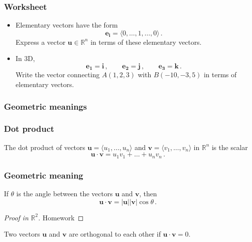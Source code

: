 \documentclass[aspectratio=169]{beamer}
\newcommand{\vect}{\mathbf}
\begin{document}
\begin{frame}
    \frametitle{Worksheet}
    \begin{itemize}
        \item Elementary vectors have the form
    $$ \vect{e_i} = \langle 0, \dots, 1,  \dots, 0\rangle \,.$$
    Express a vector $\vect{u} \in \mathbb{R}^n$ in terms of these elementary vectors.
        \item In 3D,
    \begin{equation*}
        \vect{e_1} = \vect{i} \,, \qquad 
        \vect{e_2} = \vect{j} \,, \qquad
        \vect{e_3} = \vect{k} \,.
    \end{equation*}
    Write the vector connecting $A(1,2,3)$ with $B(-10,-3,5)$ in terms of elementary vectors.
    \end{itemize}
\end{frame}

\begin{frame}
    \frametitle{Geometric meanings}
\end{frame}

\begin{frame}
    \frametitle{Dot product}
    \begin{definition}
The dot product of vectors $\textbf{u} = \langle u_1, \dots, u_n \rangle$
and $\textbf{v} = \langle v_1, \dots, v_n \rangle$ in $\mathbb{R}^n$ is the
scalar
\begin{equation*}
    \textbf{u} \cdot \textbf{v} = u_1 v_1 +\dots + u_n v_n \,.
\end{equation*}
    \end{definition}
\end{frame}

\begin{frame}
    \frametitle{Geometric meaning}
    \begin{theorem}
If $\theta$ is the angle between the vectors $\textbf{u}$ and $\textbf{v}$, then
   \begin{equation*}
        \textbf{u}\cdot \textbf{v} = |\textbf{u}|| \textbf{v}| \cos \theta \,.
   \end{equation*}
    \end{theorem}
    \pause

    \begin{proof}[Proof in $\mathbb{R}^2$]
        Homework
    \end{proof}

    \pause
    \begin{corollary}
Two vectors $\textbf{u}$ and $\textbf{v}$ are orthogonal to each other
if $\textbf{u} \cdot \textbf{v} = 0$.
    \end{corollary}
\end{frame}
\end{document}
